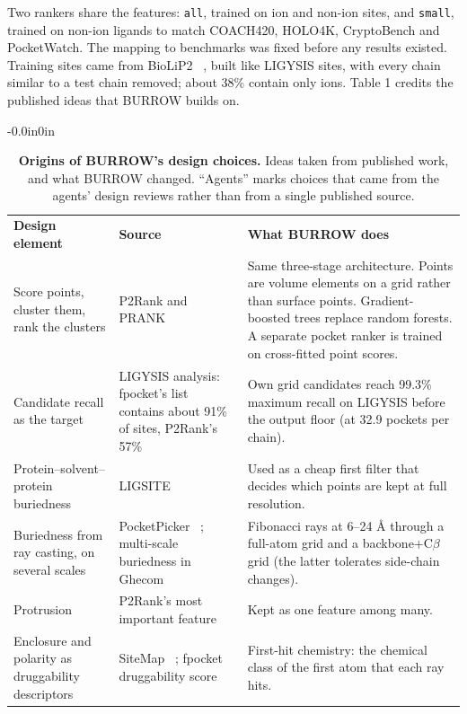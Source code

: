 \documentclass[10pt,letterpaper]{article}
\newlength\savedwidth
\newcommand\thickhline{\noalign{\global\savedwidth\arrayrulewidth\global\arrayrulewidth 2pt}%
\hline
\noalign{\global\arrayrulewidth\savedwidth}}
\begin{document}
Two rankers share the features: \texttt{all}, trained on ion and non-ion sites, and \texttt{small}, trained on non-ion ligands to match COACH420, HOLO4K, CryptoBench and PocketWatch. The mapping to benchmarks was fixed before any results existed. Training sites came from BioLiP2 ~\cite{zhang2024}, built like LIGYSIS sites, with every chain similar to a test chain removed; about 38\% contain only ions. Table 1 credits the published ideas that BURROW builds on.

\begin{table}[!ht]
\begin{adjustwidth}{-0.0in}{0in}
\centering
\caption{{\bf Origins of BURROW's design choices.} Ideas taken from published work, and what BURROW changed. ``Agents'' marks choices that came from the agents' design reviews rather than from a single published source.}
\label{table_origins}
{\footnotesize
\begin{tabular}{p{3.1cm}p{5.3cm}p{6.3cm}}
\hline
\textbf{Design element} & \textbf{Source} & \textbf{What BURROW does} \\ \thickhline
Score points, cluster them, rank the clusters & P2Rank and PRANK ~\cite{krivak2018,krivak2015} & Same three-stage architecture. Points are volume elements on a grid rather than surface points. Gradient-boosted trees replace random forests. A separate pocket ranker is trained on cross-fitted point scores. \\ \hline
Candidate recall as the target & LIGYSIS analysis: fpocket's list contains about 91\% of sites, P2Rank's 57\% ~\cite{utges2024} & Own grid candidates reach 99.3\% maximum recall on LIGYSIS before the output floor (at 32.9 pockets per chain). \\ \hline
Protein--solvent--protein buriedness & LIGSITE ~\cite{hendlich1997,huang2006} & Used as a cheap first filter that decides which points are kept at full resolution. \\ \hline
Buriedness from ray casting, on several scales & PocketPicker ~\cite{weisel2007}; multi-scale buriedness in Ghecom ~\cite{kawabata2010} & Fibonacci rays at 6--24 \AA{} through a full-atom grid and a backbone+C$\beta$ grid (the latter tolerates side-chain changes). \\ \hline
Protrusion & P2Rank's most important feature ~\cite{krivak2018} & Kept as one feature among many. \\ \hline
Enclosure and polarity as druggability descriptors & SiteMap ~\cite{halgren2009}; fpocket druggability score ~\cite{schmidtke2010b} & First-hit chemistry: the chemical class of the first atom that each ray hits. \\ \hline

\end{tabular}}
\end{adjustwidth}
\end{table}
\end{document}
